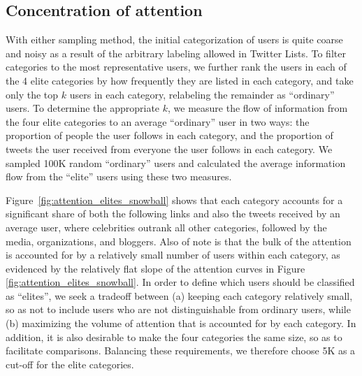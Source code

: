 \documentclass[phd,tocprelim]{cornell}
\begin{document}
\subsection{Concentration of attention}
\label{sec:attention}
With either sampling method, the initial categorization of users is quite
coarse and noisy as a result of the arbitrary labeling allowed in Twitter
Lists.  To filter categories to the most representative users, we further
rank the users in each of the 4 elite categories by how frequently they are
listed in each category, and take only the top $k$ users in each category,
relabeling the remainder as ``ordinary'' users. To determine the
appropriate $k$, we measure the flow of information from the four elite
categories to an average ``ordinary'' user in two ways: the proportion of
people the user follows in each category, and the proportion of tweets the
user received from everyone the user follows in each category.  We sampled
100K random ``ordinary'' users and calculated the average information flow
from the ``elite'' users using these two measures.

Figure~\ref{fig:attention_elites_snowball} shows that each category
accounts for a significant share of both the following links and also the
tweets received by an average user, where celebrities outrank all other
categories, followed by the media, organizations, and bloggers.  Also of
note is that the bulk of the attention is accounted for by a relatively
small number of users within each category, as evidenced by the relatively
flat slope of the attention curves in Figure
\ref{fig:attention_elites_snowball}. In order to define which users should
be classified as ``elites'', we seek a tradeoff between (a) keeping each
category relatively small, so as not to include users who are not
distinguishable from ordinary users, while (b) maximizing the volume of
attention that is accounted for by each category. In addition, it is also
desirable to make the four categories the same size, so as to facilitate
comparisons.  Balancing these requirements, we therefore choose 5K as a
cut-off for the elite categories.
\end{document}
